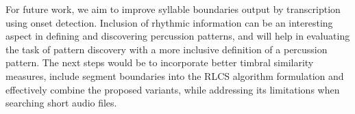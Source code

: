 For future work, we aim to improve syllable boundaries output by transcription using onset detection. Inclusion of rhythmic information can be an interesting aspect in defining and discovering percussion patterns, and will help in evaluating the task of pattern discovery with a more inclusive definition of a percussion pattern. The next steps would be to incorporate better timbral similarity measures, include segment boundaries into the \gls{RLCS} algorithm formulation and effectively combine the proposed variants, while addressing its limitations when searching short audio files.
%
%
% 
%
%
%
%

